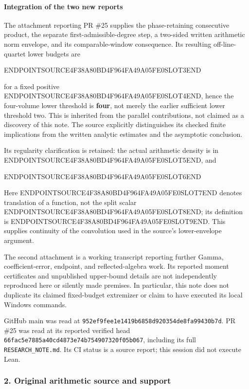 \paragraph{Integration of the two new reports}\label{endpoint-relation_moment_original--integration-of-the-two-new-reports}

The attachment reporting PR \#25 supplies the phase-retaining consecutive product, the separate first-admissible-degree step, a two-sided written arithmetic norm envelope, and its comparable-window consequence. Its resulting off-line-quartet lower budgets are

ENDPOINTSOURCE4F38A80BD4F964FA49A05FE0SLOT3END

for a fixed positive ENDPOINTSOURCE4F38A80BD4F964FA49A05FE0SLOT4END, hence the four-volume lower threshold is \textbf{four}, not merely the earlier sufficient lower threshold two. This is inherited from the parallel contributions, not claimed as a discovery of this note. The source explicitly distinguishes its checked finite implications from the written analytic estimates and the asymptotic conclusion.

Its regularity clarification is retained: the actual arithmetic density is in ENDPOINTSOURCE4F38A80BD4F964FA49A05FE0SLOT5END, and

ENDPOINTSOURCE4F38A80BD4F964FA49A05FE0SLOT6END

Here ENDPOINTSOURCE4F38A80BD4F964FA49A05FE0SLOT7END denotes translation of a function, not the split scalar ENDPOINTSOURCE4F38A80BD4F964FA49A05FE0SLOT8END; its definition is ENDPOINTSOURCE4F38A80BD4F964FA49A05FE0SLOT9END. This supplies continuity of the convolution used in the source's lower-envelope argument.

The second attachment is a working transcript reporting further Gamma, coefficient-error, endpoint, and reflected-algebra work. Its reported moment certificates and unpublished upper-bound details are not independently reproduced here or silently made premises. In particular, this note does not duplicate its claimed fixed-budget extremizer or claim to have executed its local Windows commands.

GitHub main was read at \texttt{952ef9fee1e1419b6858d920354de8fa99430b7d}. PR \#25 was read at its reported verified head \texttt{66fac5e7885a40cd4873e74b754907320f05b067}, including its full \texttt{RESEARCH\_NOTE.md}. Its CI status is a source report; this session did not execute Lean.

\subsubsection{2. Original arithmetic source and support}\label{endpoint-relation_moment_original--original-arithmetic-source-and-support}

